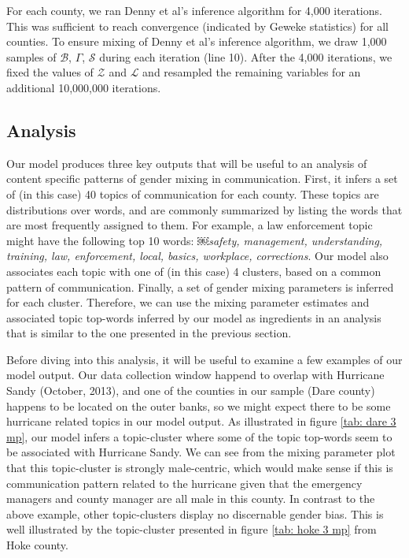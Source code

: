 \documentclass{pnastwo}
\begin{document}
\begin{article}
For each county, we ran Denny et al's inference algorithm for 4,000
iterations. This was sufficient to reach convergence (indicated by
Geweke statistics) for all counties. To ensure mixing of Denny et al's
inference algorithm, we draw 1,000 samples of $\mathcal{B}$, $\Gamma$,
$\mathcal{S}$ during each iteration (line 10). After the 4,000
iterations, we fixed the values of $\mathcal{Z}$ and $\mathcal{L}$ and
resampled the remaining variables for an additional 10,000,000
iterations.



\subsection{Analysis}
Our model produces three key outputs that will be useful to an analysis of content specific patterns of gender mixing in communication. First, it infers a set of (in this case) 40 topics of communication for each county. These topics are distributions over words, and are commonly summarized by listing the words that are most frequently assigned to them. For example, a law enforcement topic might have the following top 10 words:
￼\emph{safety, management, understanding, training, law, enforcement, local, basics, workplace, corrections}. Our model also associates each topic with one of (in this case) 4 clusters, based on a common pattern of communication. Finally, a set of gender mixing parameters is inferred for each cluster. Therefore, we can use the mixing parameter estimates and associated topic top-words inferred by our model as ingredients in an analysis that is similar to the one presented in the previous section.

Before diving into this analysis, it will be useful to examine a few examples of our model output. Our data collection window happend to overlap with Hurricane Sandy (October, 2013), and one of the counties in our sample (Dare county) happens to be located on the outer banks, so we might expect there to be some hurricane related topics in our model output. As illustrated in figure \ref{tab: dare 3 mp}, our model infers a topic-cluster where some of the topic top-words seem to be associated with Hurricane Sandy. We can see from the mixing parameter plot that this topic-cluster is strongly male-centric, which would make sense if this is communication pattern related to the hurricane given that the emergency managers and county manager are all male in this county. In contrast to the above example, other topic-clusters display no discernable gender bias. This is well illustrated by the topic-cluster presented in figure \ref{tab: hoke 3 mp} from Hoke county.


\end{article}
\end{document}
